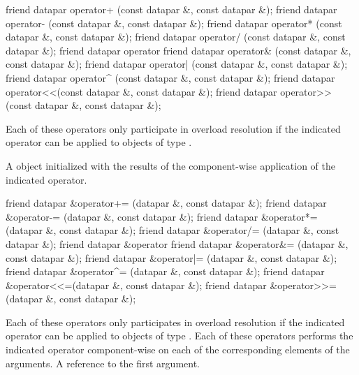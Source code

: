 
\begin{itemdecl}
friend datapar operator+ (const datapar &, const datapar &);
friend datapar operator- (const datapar &, const datapar &);
friend datapar operator* (const datapar &, const datapar &);
friend datapar operator/ (const datapar &, const datapar &);
friend datapar operator%
friend datapar operator& (const datapar &, const datapar &);
friend datapar operator| (const datapar &, const datapar &);
friend datapar operator^ (const datapar &, const datapar &);
friend datapar operator<<(const datapar &, const datapar &);
friend datapar operator>>(const datapar &, const datapar &);
\end{itemdecl}
\begin{itemdescr}
  \pnum\remarks Each of these operators only participate in overload resolution if the indicated operator can be applied to objects of type .

  \pnum\returns A \datapar object initialized with the results of the component-wise application of the indicated operator.
\end{itemdescr}

\begin{itemdecl}
friend datapar &operator+= (datapar &, const datapar &);
friend datapar &operator-= (datapar &, const datapar &);
friend datapar &operator*= (datapar &, const datapar &);
friend datapar &operator/= (datapar &, const datapar &);
friend datapar &operator%
friend datapar &operator&= (datapar &, const datapar &);
friend datapar &operator|= (datapar &, const datapar &);
friend datapar &operator^= (datapar &, const datapar &);
friend datapar &operator<<=(datapar &, const datapar &);
friend datapar &operator>>=(datapar &, const datapar &);
\end{itemdecl}
\begin{itemdescr}
  \pnum\remarks Each of these operators only participates in overload resolution if the indicated operator can be applied to objects of type .
  \pnum\effects Each of these operators performs the indicated operator component-wise on each of the corresponding elements of the arguments.
  \pnum\returns A reference to the first argument.
\end{itemdescr}

